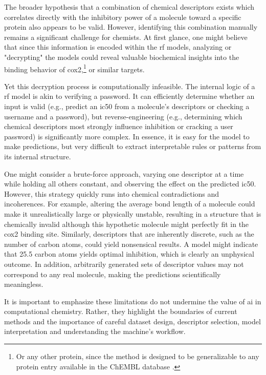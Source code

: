 \documentclass[11pt]{article}
\begin{document}
The broader hypothesis that a combination of chemical descriptors exists which correlates directly with the inhibitory power of a molecule toward a specific protein also appears to be valid. However, identifying this combination manually remains a significant challenge for chemists. At first glance, one might believe that since this information is encoded within the \gls{rf} models, analyzing or "decrypting" the models could reveal valuable biochemical insights into the binding behavior of \gls{cox2},\footnote{Or any other protein, since the method is designed to be generalizable to any protein entry available in the ChEMBL database \cite{ChemblDatabase}.} or similar targets.

Yet this decryption process is computationally infeasible. The internal logic of a \gls{rf} model is akin to verifying a password. It can efficiently determine whether an input is valid (e.g., predict an \gls{ic50} from a molecule's descriptors or checking a username and a password), but reverse-engineering (e.g., determining which chemical descriptors most strongly influence inhibition or cracking a user password) is significantly more complex. In essence, it is easy for the model to make predictions, but very difficult to extract interpretable rules or patterns from its internal structure.

One might consider a brute-force approach, varying one descriptor at a time while holding all others constant, and observing the effect on the predicted \gls{ic50}. However, this strategy quickly runs into chemical contradictions and incoherences. For example, altering the average bond length of a molecule could make it unrealistically large or physically unstable, resulting in a structure that is chemically invalid although this hypothetic molecule might perfectly fit in the \gls{cox2} binding site. Similarly, descriptors that are inherently discrete, such as the number of carbon atoms, could yield nonsensical results. A model might indicate that 25.5 carbon atoms yields optimal inhibition, which is clearly an unphysical outcome. In addition, arbitrarily generated sets of descriptor values may not correspond to any real molecule, making the predictions scientifically meaningless.

It is important to emphasize these limitations do not undermine the value of \gls{ai} in computational chemistry. Rather, they highlight the boundaries of current methods and the importance of careful dataset design, descriptor selection, model interpretation and understanding the machine's workflow.
\end{document}
